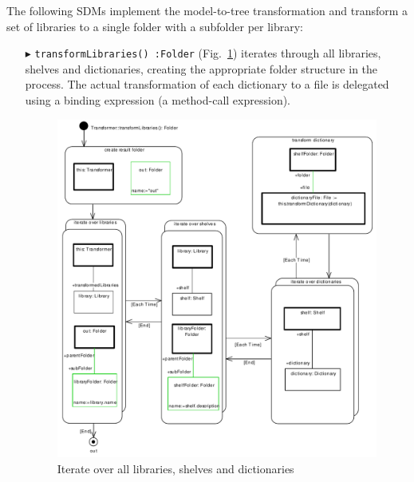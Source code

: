 The following SDMs implement the model-to-tree transformation and transform a set of libraries to a single folder with a subfolder per library:
\begin{enumerate}    
\item[$\blacktriangleright$] \texttt{transformLibraries()~:Folder} (Fig.~\ref{fig:moca-transformLibraries}) iterates through all libraries, shelves and dictionaries, creating the appropriate folder structure in the process.
The actual transformation of each dictionary to a file is delegated using a binding expression (a method-call expression).    
\begin{figure}[!htbp]
\begin{center}
 \includegraphics[width=\textwidth]{pics/moca/4ModelToMocaTree/transformLibraries}
  \caption{Iterate over all libraries, shelves and dictionaries} 
  \label{fig:moca-transformLibraries}
\end{center}
\end{figure}


\end{enumerate}
